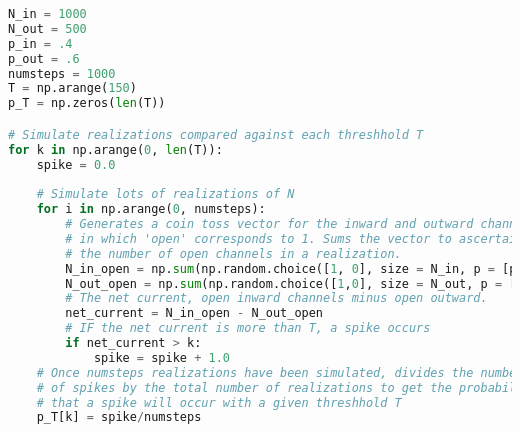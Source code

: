 \documentclass{article}
\begin{document}
\begin{lstlisting}[language=Python, caption=Python example]
N_in = 1000
N_out = 500
p_in = .4
p_out = .6
numsteps = 1000
T = np.arange(150)
p_T = np.zeros(len(T))

# Simulate realizations compared against each threshhold T
for k in np.arange(0, len(T)):
    spike = 0.0
    
    # Simulate lots of realizations of N
    for i in np.arange(0, numsteps):
        # Generates a coin toss vector for the inward and outward channels
        # in which 'open' corresponds to 1. Sums the vector to ascertain
        # the number of open channels in a realization.
        N_in_open = np.sum(np.random.choice([1, 0], size = N_in, p = [p_in, 1 - p_in]))
        N_out_open = np.sum(np.random.choice([1,0], size = N_out, p = [p_out, 1 - p_out]))
        # The net current, open inward channels minus open outward.
        net_current = N_in_open - N_out_open
        # IF the net current is more than T, a spike occurs
        if net_current > k:
            spike = spike + 1.0
    # Once numsteps realizations have been simulated, divides the number
    # of spikes by the total number of realizations to get the probability
    # that a spike will occur with a given threshhold T
    p_T[k] = spike/numsteps
\end{lstlisting}
\end{document}
